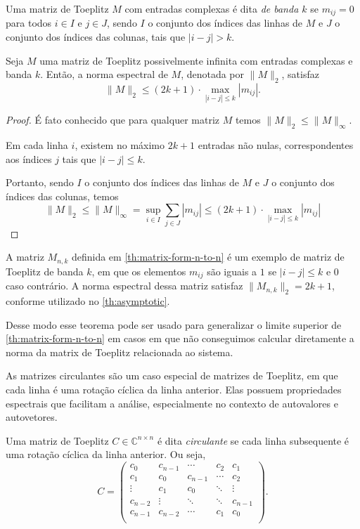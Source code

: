 \begin{definition*}
  Uma matriz de Toeplitz $ M $ com entradas complexas é dita \textit{de banda $ k $} se $ m_{ij} = 0 $ para todos $ i \in I$ e $j \in J $, sendo $I$ o conjunto dos índices das linhas de $M$ e $J$ o conjunto dos índices das colunas, tais que $ |i - j| > k $.
\end{definition*}

\begin{theorem*}
  Seja \( M \) uma matriz de Toeplitz possivelmente infinita com entradas complexas e banda \( k \). Então, a norma espectral de \( M \), denotada por \( \| M \|_2 \), satisfaz \[ \| M \|_2 \leq (2k + 1) \cdot \max_{|i - j| \leq k} |m_{ij}|. \]
\end{theorem*}
\begin{proof}
  É fato conhecido que para qualquer matriz $M$ temos $\| M \|_2 \leq \| M \|_\infty$.

  Em cada linha $i$, existem no máximo $2k + 1$ entradas não nulas, correspondentes aos índices $j$ tais que $\lvert i - j \rvert \leq k$.

  Portanto, sendo $I$ o conjunto dos índices das linhas de $M$ e $J$ o conjunto dos índices das colunas, temos \[ \| M \|_2 \le \| M \|_\infty = \sup_{i \in I} \sum_{j \in J} |m_{ij}| \leq (2k + 1) \cdot \max_{|i - j| \leq k} |m_{ij}| \]
\end{proof}

A matriz $ M_{n,k} $ definida em \ref{th:matrix-form-n-to-n} é um exemplo de matriz de Toeplitz de banda $ k $, em que os elementos $ m_{ij} $ são iguais a $ 1 $ se $ |i - j| \le k $ e $ 0 $ caso contrário. A norma espectral dessa matriz satisfaz $ \| M_{n,k} \|_2 = 2k + 1 $, conforme utilizado no \ref{th:asymptotic}.

Desse modo esse teorema pode ser usado para generalizar o limite superior de \ref{th:matrix-form-n-to-n} em casos em que não conseguimos calcular diretamente a norma da matrix de Toeplitz relacionada ao sistema.

As matrizes circulantes são um caso especial de matrizes de Toeplitz, em que cada linha é uma rotação cíclica da linha anterior. Elas possuem propriedades espectrais que facilitam a análise, especialmente no contexto de autovalores e autovetores.

\begin{definition*}
  Uma matriz de Toeplitz $ C \in \mathbb{C}^{n \times n} $ é dita \textit{circulante} se cada linha subsequente é uma rotação cíclica da linha anterior. Ou seja,
  \[
    C = \begin{pmatrix}
      c_0     & c_{n-1} & \cdots  & c_2    & c_1     \\
      c_1     & c_0     & c_{n-1} & \cdots & c_2     \\
      \vdots  & c_1     & c_0     & \ddots & \vdots  \\
      c_{n-2} & \vdots  & \ddots  & \ddots & c_{n-1} \\
      c_{n-1} & c_{n-2} & \cdots  & c_1    & c_0     \\
    \end{pmatrix}.
  \]
\end{definition*}

